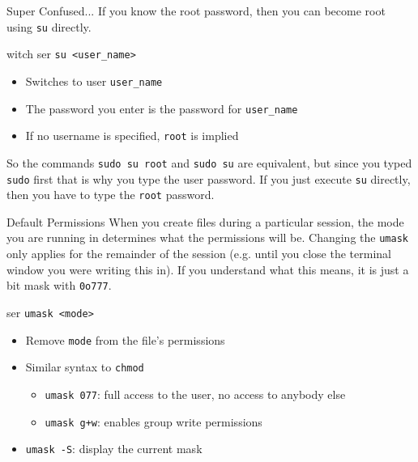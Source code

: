 \begin{frame}[fragile]{Super Confused...}
  If you know the root password, then you can become root using \texttt{su} directly.
  \begin{block}{witch ser}
    \texttt{su <user\_name>}
    \begin{itemize}
      \item Switches to user \texttt{user\_name}
      \item The password you enter is the password for \texttt{user\_name}
      \item If no username is specified, \texttt{root} is implied
    \end{itemize}
  \end{block}

  So the commands \texttt{sudo su root} and \texttt{sudo su} are equivalent, but since you typed \texttt{sudo}
  first that is why you type the user password.  If you just execute \texttt{su} directly, then you have to type
  the \texttt{root} password.
\end{frame}

\begin{frame}[fragile]{Default Permissions}
  When you create files during a particular session, the mode you are running in determines what the permissions
  will be.  Changing the \texttt{umask} only applies for the remainder of the session (e.g. until you close
  the terminal window you were writing this in).  If you understand what this means, it is just a bit mask with
  \texttt{0o777}.

  \begin{block}{ser }
    \texttt{umask <mode>}
    \begin{itemize}
      \item Remove \texttt{mode} from the file's permissions
      \item Similar syntax to \texttt{chmod}
      \begin{itemize}
        \item \texttt{umask 077}: full access to the user, no access to anybody else
        \item \texttt{umask g+w}: enables group write permissions
      \end{itemize}
      \item \texttt{umask -S}: display the current mask
    \end{itemize}
  \end{block}
\end{frame}

